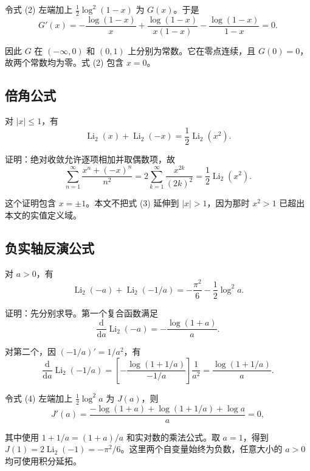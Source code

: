 \documentclass[11pt,a4paper]{article}
\begin{document}
令式 (2) 左端加上 \(\tfrac12\log^2(1-x)\) 为 \(G(x)\)。于是
\[
G'(x)=-\frac{\log(1-x)}x
+\frac{\log(1-x)}{x(1-x)}
-\frac{\log(1-x)}{1-x}=0.
\]

因此 \(G\) 在 \((-\infty,0)\) 和 \((0,1)\)
上分别为常数。它在零点连续，且 \(G(0)=0\)，故两个常数均为零。式 (2) 包含
\(x=0\)。

\hypertarget{ux500dux89d2ux516cux5f0f}{%
\subsection{倍角公式}\label{ux500dux89d2ux516cux5f0f}}

对 \(|x|\leqslant1\)，有
\begin{equation}
\operatorname{Li}_2(x)+\operatorname{Li}_2(-x)
=\frac12\operatorname{Li}_2(x^2).
\tag{3}
\end{equation}

证明：绝对收敛允许逐项相加并取偶数项，故
\[
\sum_{n=1}^{\infty}\frac{x^n+(-x)^n}{n^2}
=2\sum_{k=1}^{\infty}\frac{x^{2k}}{(2k)^2}
=\frac12\operatorname{Li}_2(x^2).
\]

这个证明包含 \(x=\pm1\)。本文不把式 (3) 延伸到 \(|x|>1\)，因为那时
\(x^2>1\) 已超出本文的实值定义域。

\hypertarget{ux8d1fux5b9eux8f74ux53cdux6f14ux516cux5f0f}{%
\subsection{负实轴反演公式}\label{ux8d1fux5b9eux8f74ux53cdux6f14ux516cux5f0f}}

对 \(a>0\)，有
\begin{equation}
\operatorname{Li}_2(-a)+\operatorname{Li}_2(-1/a)
=-\frac{\pi^2}{6}-\frac12\log^2a.
\tag{4}
\end{equation}

证明：先分别求导。第一个复合函数满足
\[
\frac{\mathrm d}{\mathrm da}\operatorname{Li}_2(-a)
=-\frac{\log(1+a)}a.
\]

对第二个，因 \((-1/a)'=1/a^2\)，有
\[
\frac{\mathrm d}{\mathrm da}\operatorname{Li}_2(-1/a)
=\left[-\frac{\log(1+1/a)}{-1/a}\right]\frac1{a^2}
=\frac{\log(1+1/a)}a.
\]

令式 (4) 左端加上 \(\tfrac12\log^2a\) 为 \(J(a)\)，则
\[
J'(a)=\frac{-\log(1+a)+\log(1+1/a)+\log a}{a}=0,
\]

其中使用 \(1+1/a=(1+a)/a\) 和实对数的乘法公式。取 \(a=1\)，得到
\(J(1)=2\operatorname{Li}_2(-1)=-\pi^2/6\)。这里两个自变量始终为负数，任意大小的
\(a>0\) 均可使用积分延拓。
\end{document}
